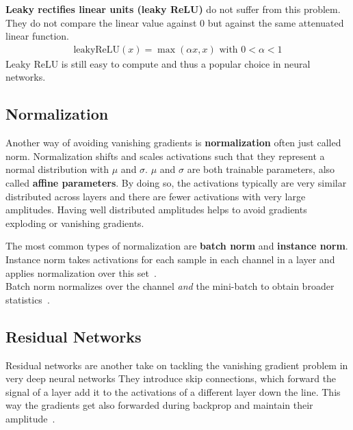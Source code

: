 \textbf{Leaky rectifies linear units (leaky ReLU)} do not suffer from this problem.
They do not compare the linear value against $0$ but against the same attenuated linear function.
\begin{align}
    \text{leakyReLU}(x) = \max(\alpha x, x) \text{ with } 0 < \alpha < 1
\end{align}
Leaky ReLU is still easy to compute and thus a popular choice in neural networks.

\subsection{Normalization}
Another way of avoiding vanishing gradients is \textbf{normalization} often just called norm.
Normalization shifts and scales activations such that they represent a normal distribution with $\mu$ and $\sigma$.
$\mu$ and $\sigma$ are both trainable parameters, also called \textbf{affine parameters}.
By doing so, the activations typically are very similar distributed across layers and there are fewer activations with very large amplitudes.
Having well distributed amplitudes helps to avoid gradients exploding or vanishing gradients.

The most common types of normalization are \textbf{batch norm} and \textbf{instance norm}.
Instance norm takes activations for each sample in each channel in a layer and applies normalization over this set~\cite{IN}.\\
Batch norm normalizes over the channel \textit{and} the mini-batch to obtain broader statistics~\cite{BN}.

\subsection{Residual Networks}
Residual networks are another take on tackling the vanishing gradient problem in very deep neural networks 
They introduce skip connections, which forward the signal of a layer add it to the activations of a different layer down the line.
This way the gradients get also forwarded during backprop and maintain their amplitude~\cite{resnet}.
